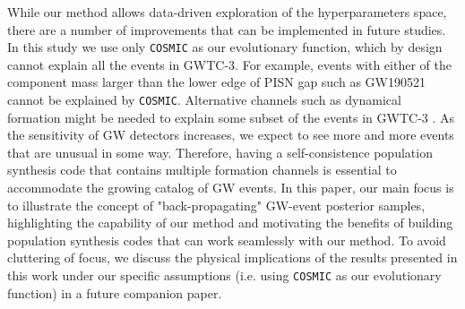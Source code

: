 \documentclass[twocolumn]{aastex631}
\begin{document}
While our method allows data-driven exploration of the hyperparameters space, there are a number of improvements that can be implemented in future studies.
In this study we use only \texttt{COSMIC} as our evolutionary function, which by design cannot explain all the events in GWTC-3.
For example, events with either of the component mass larger than the lower edge of PISN gap such as GW190521 cannot be explained by \texttt{COSMIC}.
Alternative channels such as dynamical formation might be needed to explain some subset of the events in GWTC-3 \citep{Zevin2021}.
As the sensitivity of GW detectors increases, we expect to see more and more events that are unusual in some way.
Therefore, having a self-consistence population synthesis code that contains multiple formation channels is essential to accommodate the growing catalog of GW events.
In this paper, our main focus is to illustrate the concept of "back-propagating" GW-event posterior samples,
highlighting the capability of our method and motivating the benefits of building population synthesis codes that can work seamlessly with our method.
To avoid cluttering of focus, we discuss the physical implications of the results presented in this work under our specific assumptions (i.e. using \texttt{COSMIC} as our evolutionary function) in a future companion paper.
\end{document}
